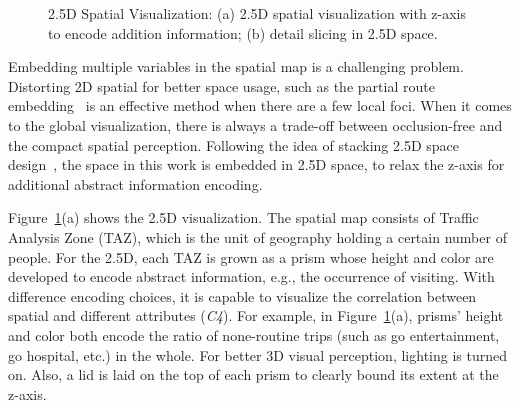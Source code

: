 \begin{figure}[htb!]
\centering
{}\hspace{5pt}
\hspace{5pt}
\caption{2.5D Spatial Visualization: (a) 2.5D spatial visualization with z-axis to encode addition information; (b) detail slicing in 2.5D space.}
\label{fig:2.5D}
\end{figure}


Embedding multiple variables in the spatial map is a challenging problem. Distorting 2D spatial for better space usage, such as the partial route embedding~\citep{sun2016embedding} is an effective method when there are a few local foci. When it comes to the global visualization, there is always a trade-off between occlusion-free and the compact spatial perception. Following the idea of stacking 2.5D space design~\citep{Tominski2012_stacking}, the space in this work is embedded in 2.5D space, to relax the z-axis for additional abstract information encoding.

Figure~\ref{fig:2.5D}(a) shows the 2.5D visualization. The spatial map consists of Traffic Analysis Zone (TAZ), which is the unit of geography holding a certain number of people. For the 2.5D, each TAZ is grown as a prism whose height and color are developed to encode abstract information, e.g., the occurrence of visiting. With difference encoding choices, it is capable to visualize the correlation between spatial and different attributes (\textit{C4}). For example, in Figure~\ref{fig:2.5D}(a), prisms' height and color both encode the ratio of none-routine trips (such as go entertainment, go hospital, etc.) in the whole. For better 3D visual perception, lighting is turned on. Also, a lid is laid on the top of each prism to clearly bound its extent at the z-axis.

